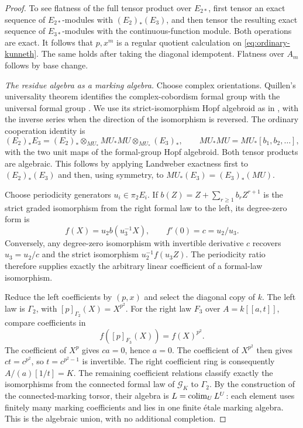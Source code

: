 \begin{proof}
To see flatness of the full tensor product over $E_{2*}$, first
tensor an exact sequence of $E_{2*}$-modules with
$(E_2)_*(E_3)$, and then tensor the resulting exact sequence of
$E_{3*}$-modules with the continuous-function module.  Both operations
are exact.  It follows that $p,x^m$ is a regular quotient calculation
on \eqref{eq:ordinary-kunneth}.  The same holds after taking the
diagonal idempotent.  Flatness over $A_m$ follows by base change.

\smallskip\noindent\emph{The residue algebra as a marking algebra.}
Choose complex orientations. Quillen's universality theorem identifies
the complex-cobordism formal group with the universal formal group
\cite[Section~3, Theorem~2]{Quillen69}. We use its strict-isomorphism
Hopf algebroid as in \cite[Section~3.1]{Powell12}, with the inverse
series when the direction of the isomorphism is reversed.
The ordinary cooperation identity is
\[
 (E_2)_*E_3=(E_2)_*\otimes_{MU_*}MU_*MU
                         \otimes_{MU_*}(E_3)_*,
 \qquad MU_*MU=MU_*[b_1,b_2,\ldots],
\]
with the two unit maps of the formal-group Hopf algebroid.
Both tensor products are algebraic.  This follows by applying
Landweber exactness \cite[Theorem~2.7]{HS99} first to $(E_2)_*(E_3)$ and then, using symmetry,
to $MU_*(E_3)=(E_3)_*(MU)$.

Choose periodicity generators $u_i\in\pi_2E_i$.  If
$b(Z)=Z+\sum_{r\geq1}b_rZ^{r+1}$ is the strict graded
isomorphism from the right formal law to the left, its degree-zero
form is
\[
          f(X)=u_2b(u_3^{-1}X),\qquad f'(0)=c=u_2/u_3.
\]
Conversely, any degree-zero isomorphism with invertible derivative
$c$ recovers $u_3=u_2/c$ and the strict isomorphism
$u_2^{-1}f(u_3Z)$.  The periodicity ratio therefore supplies exactly
the arbitrary linear coefficient of a formal-law isomorphism.

Reduce the left coefficients by $(p,x)$ and select the diagonal
copy of $k$.  The left law is $\Gamma_2$, with
$[p]_{\Gamma_2}(X)=X^{p^2}$.  For the right law $F_3$ over
$A=k[[a,t]]$, compare coefficients in
\[
          f([p]_{F_3}(X))=f(X)^{p^2}.
\]
The coefficient of $X^p$ gives $ca=0$, hence $a=0$.
The coefficient of $X^{p^2}$ then gives
$ct=c^{p^2}$, so $t=c^{p^2-1}$ is invertible.
The right coefficient ring is consequently
$A/(a)[1/t]=K$.  The remaining coefficient relations classify
exactly the isomorphisms from the connected formal law of
$\mathcal G_K$ to $\Gamma_2$.  By the construction of the
connected-marking torsor, their algebra is
$L=\operatorname*{colim}_U L^U$: each element uses finitely many marking
coefficients and lies in one finite \'{e}tale marking algebra.
This is the algebraic union, with no additional completion.


\end{proof}
